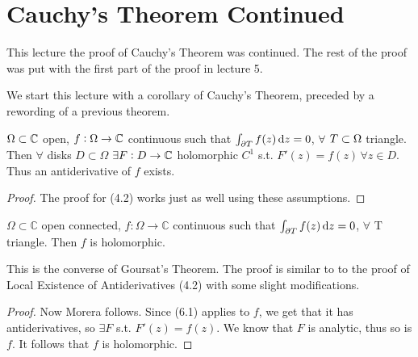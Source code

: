 \setcounter{section}{0}
\setcounter{theorem}{0}



\section{Cauchy's Theorem Continued}

This lecture the proof of Cauchy's Theorem was continued. The rest of the proof was put with the first part of the proof in lecture 5.

We start this lecture with a corollary of Cauchy's Theorem, preceded by a rewording of a previous theorem.

\begin{theorem}

$ \Omega \subset \mathbb{C} $ open, $f:\Omega \rightarrow \mathbb{C}$ continuous such that $\int_{\partial T} f(z) \dif z = 0$, $ \forall$ $T \subset \Omega$ triangle. Then $\forall$ disks $D\subset \Omega$ $\exists F:D\rightarrow \mathbb{C}$ holomorphic $C^1$ s.t. $F'(z)=f(z) \, \forall z\in D$. Thus an antiderivative of $f$ exists.
\end{theorem}


\begin{proof}
The proof for (4.2) works just as well using these assumptions.
\end{proof}


\begin{corollary}
$\Omega \subset \mathbb{C}$ open connected, $f:\Omega \rightarrow \mathbb{C}$ continuous such that $\int_{\partial T} f(z) \dif z = 0$, $ \forall$ T triangle. Then $f$ is holomorphic.
\end{corollary}

\begin{note}
This is the converse of Goursat's Theorem. The proof is similar to to the proof of Local Existence of Antiderivatives (4.2) with some slight modifications.
\end{note}






\begin{proof} Now Morera follows. Since (6.1) applies to $f$, we get that it has antiderivatives, so $\exists F$ s.t. $F'(z)=f(z)$. We know that $F$ is analytic, thus so is $f$. It follows that $f$ is holomorphic.

\end{proof}





